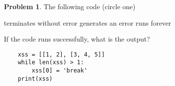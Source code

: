 \documentclass[10pt]{article}
\theoremstyle{definition}
\newtheorem{problem}{Problem}
\begin{document}
\begin{problem}
    The following code (circle one)

    \vspace{0.25in}
    \hspace{0.5in}terminates without error 
    \hspace{1in}generates an error
    \hspace{1in}runs forever
    \vspace{0.25in}

    \noindent
    If the code runs successfully, what is the output?
\end{problem}
\begin{lstlisting}
    xss = [[1, 2], [3, 4, 5]]
    while len(xss) > 1:
        xss[0] = 'break'
    print(xss)
\end{lstlisting}
\vspace{1.5in}
\end{document}
